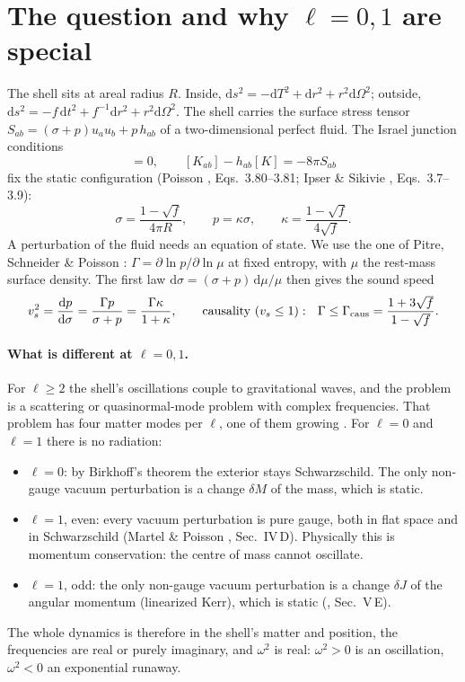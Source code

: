 \documentclass[10.5pt,a4paper]{article}
\newcommand{\sq}{\sqrt{f}}
\newcommand{\dd}{\mathrm{d}}
\begin{document}
\section{The question and why $\ell=0,1$ are special}
The shell sits at areal radius $R$. Inside, $\dd s^2=-\dd T^2+\dd r^2+r^2\dd\Omega^2$; outside,
$\dd s^2=-f\,\dd t^2+f^{-1}\dd r^2+r^2\dd\Omega^2$. The shell carries the surface stress tensor
$S_{ab}=(\sigma+p)u_au_b+p\,h_{ab}$ of a two-dimensional perfect fluid. The Israel junction conditions
\cite{Israel66,Poisson04}
\begin{equation}
[h_{ab}]=0,\qquad [K_{ab}]-h_{ab}[K]=-8\pi S_{ab}
\label{eq:israel}
\end{equation}
fix the static configuration (Poisson \cite{Poisson04}, Eqs.~3.80--3.81; Ipser \& Sikivie \cite{IS84}, Eqs.~3.7--3.9):
\begin{equation}
\sigma=\frac{1-\sq}{4\pi R},\qquad p=\kappa\sigma,\qquad \kappa=\frac{1-\sq}{4\sq}.
\label{eq:bg}
\end{equation}
A perturbation of the fluid needs an equation of state. We use the one of Pitre, Schneider \& Poisson \cite{PSP26}:
$\Gamma=\partial\ln p/\partial\ln\mu$ at fixed entropy, with $\mu$ the rest-mass surface density. The first law
$\dd\sigma=(\sigma+p)\,\dd\mu/\mu$ then gives the sound speed
\begin{equation}
v_s^2=\frac{\dd p}{\dd\sigma}=\frac{\Gamma p}{\sigma+p}=\frac{\Gamma\kappa}{1+\kappa},\qquad
\text{causality } (v_s\le1):\ \ \Gamma\le\Gamma_{\rm caus}=\frac{1+3\sq}{1-\sq}.
\label{eq:eos}
\end{equation}

\paragraph{What is different at $\ell=0,1$.} For $\ell\ge2$ the shell's oscillations couple to gravitational waves, and
the problem is a scattering or quasinormal-mode problem with complex frequencies. That problem has four matter modes per
$\ell$, one of them growing \cite{PSP26}. For $\ell=0$ and $\ell=1$ there is no radiation:
\begin{itemize}
\item $\ell=0$: by Birkhoff's theorem the exterior stays Schwarzschild. The only non-gauge vacuum perturbation is a
change $\delta M$ of the mass, which is static.
\item $\ell=1$, even: every vacuum perturbation is pure gauge, both in flat space and in Schwarzschild (Martel \& Poisson
\cite{MP05}, Sec.~IV\,D). Physically this is momentum conservation: the centre of mass cannot oscillate.
\item $\ell=1$, odd: the only non-gauge vacuum perturbation is a change $\delta J$ of the angular momentum (linearized
Kerr), which is static (\cite{MP05}, Sec.~V\,E).
\end{itemize}
The whole dynamics is therefore in the shell's matter and position, the frequencies are real or purely imaginary, and
$\omega^2$ is real: $\omega^2>0$ is an oscillation, $\omega^2<0$ an exponential runaway.
\end{document}
